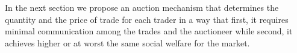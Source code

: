 






In the next section we propose an auction mechanism that determines the quantity and the price of trade for each trader in a way that first, it requires minimal communication among the trades and the auctioneer while second, it achieves higher or at worst the same social welfare for the market.



